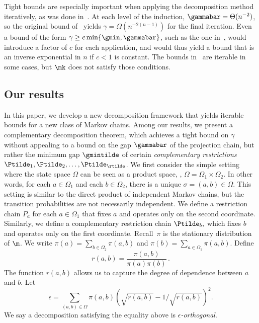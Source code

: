 Tight bounds are especially important when applying the decomposition 
method iteratively, as was done in~\cite{MS}. At each level of the 
induction, $\gammabar=\Theta(n^{-2})$, so the original bound 
of~\cite{MR00} yields $\gamma=\Omega(n^{-2(n-1)})$ for the final 
iteration.   Even a bound of the form $\gamma \geq c \min\{\gmin, 
\gammabar\}$, such as the one in~\cite{PS17}, would introduce a factor 
of $c$ for each application, and would thus yield a bound that is an 
inverse exponential in $n$ if $c<1$ is constant. The bounds 
in~\cite{jstv04} are iterable in some cases, but $\mk$ does not satisfy 
those conditions.

\subsection{Our results}

In this paper, we develop a new decomposition framework that yields 
iterable bounds for a new class of Markov chains. Among our results, we 
present a complementary decomposition theorem, which achieves a tight 
bound on $\gamma$ without appealing to a bound on the gap $\gammabar$ 
of the projection chain, but rather the minimum gap $\gmintilde$ of 
certain \emph{complementary restrictions} 
$\Ptilde_1,\Ptilde_2,\ldots,\Ptilde_{\rtilde}$. We first consider the 
simple setting where the state space $\Omega$ can be seen as a product 
space, \ie,  $\Omega=\Omega_1\times\Omega_2$. In other words, for each 
$a\in\Omega_1$ and each $b\in\Omega_2$, there is a unique 
$\sigma=(a,b)\in \Omega$. This setting is similar to the direct product 
of independent Markov chains, but the transition probabilities are not 
necessarily independent. We define a restriction chain $P_a$ for each 
$a\in\Omega_1$ that fixes $a$ and operates only on the second 
coordinate.  Similarly, we define a complementary restriction chain 
$\Ptilde_b,$ which fixes $b$ and operates only on the first coordinate. 
Recall~$\pi$ is the stationary distribution of $\m$. We write $\pi(a) = 
\sum_{b\in \Omega_2}\pi(a,b)$ and $\pi(b) = \sum_{a\in 
\Omega_1}\pi(a,b)$.  Define \[r(a,b) = \frac{\pi(a,b)}{\pi(a)\pi(b)}\,.\] 
The function $r(a,b)$ allows us to capture the degree of dependence 
between $a$ and $b$.  Let
\begin{equation}\label{eq:eps}
\epsilon = \sum_{(a,b)\in\Omega}\pi(a,b)\left(\sqrt{r(a,b)} -
1/\sqrt{r(a,b)}\right)^2.
\end{equation}
We say a decomposition satisfying the equality above is \emph{$\epsilon$-orthogonal}. 
%
%
%
%
%

